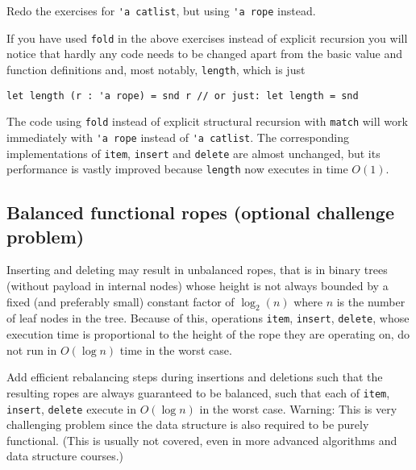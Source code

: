 \documentclass[a4paper,11pt]{article}
\begin{document}
Redo the exercises for \verb|'a catlist|, but using \verb|'a rope| instead.

If you have used \verb|fold| in the above exercises instead of explicit recursion you will notice that hardly any code needs to be changed apart from the basic value and function definitions and, most notably, \verb|length|, which is just
\begin{verbatim}
let length (r : 'a rope) = snd r // or just: let length = snd
\end{verbatim} 
The code using \verb|fold| instead of explicit structural recursion with \verb|match| will work immediately with \verb|'a rope| instead of \verb|'a catlist|.  The corresponding implementations of \verb|item|, \verb|insert| and \verb|delete| are almost unchanged, but its performance is vastly improved because \verb|length| now executes in time $O(1)$.  

\subsection{Balanced functional ropes (optional challenge problem)}

Inserting and deleting may result in unbalanced ropes, that is in binary trees (without payload in internal nodes) whose height is not always bounded by a fixed  (and preferably small) constant factor of $\log_2 (n)$ where $n$ is the number of leaf nodes in the tree.  Because of this, operations \verb|item|, \verb|insert|, \verb|delete|, whose execution time is proportional to the height of the rope they are operating on, do not run in $O(\log n)$ time in the worst case.  

Add efficient rebalancing steps during insertions and deletions such that the resulting ropes are always guaranteed to be balanced, such that each of \verb|item|, \verb|insert|, \verb|delete|  execute in $O(\log n)$ in the worst case.  Warning: This is very challenging problem since the data structure is also required to be purely functional. (This is usually not covered, even in more advanced algorithms and data structure courses.) 
\end{document}
